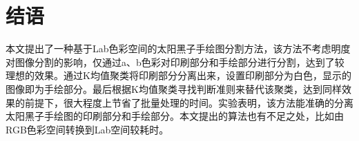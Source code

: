 \documentclass[UTF8,a4paper,twoside]{ctexart}
\begin{document}

\section{结语}

本文提出了一种基于Lab色彩空间的太阳黑子手绘图分割方法，该方法不考虑明度对图像分割的影响，仅通过a、b色彩对印刷部分和手绘部分进行分割，达到了较理想的效果。通过K均值聚类将印刷部分分离出来，设置印刷部分为白色，显示的图像即为手绘部分。最后根据K均值聚类寻找判断准则来替代该聚类，达到同样效果的前提下，很大程度上节省了批量处理的时间。实验表明，该方法能准确的分离太阳黑子手绘图的印刷部分和手绘部分。本文提出的算法也有不足之处，比如由RGB色彩空间转换到Lab空间较耗时。





\end{document}
